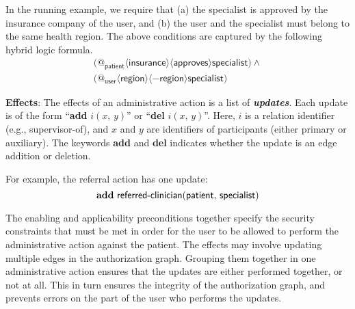 \documentclass{acm_proc_article-sp}
\newcommand{\Dfn}[1]{\textbf{\emph{#1}}}
\begin{document}
\begin{compactitem}
  In the running example, we require that (a) the \textsf{specialist}
  is approved by the insurance company of the \textsf{user}, and (b)
  the \textsf{user} and the \textsf{specialist} must belong to the
  same health region.  The above conditions are captured by the
  following hybrid logic formula.
  \begin{multline*}
    \big(
    @_{\mathsf{patient}} \langle
    \mathsf{insurance} \rangle
    \langle \mathsf{approves}\rangle
    \mathsf{specialist} 
    \big) \land \mbox{}\\
    \big(
    @_{\mathsf{user}} \langle
    \mathsf{region} \rangle
   \langle -
    \mathsf{region} \rangle
    \mathsf{specialist}
    \big)
  \end{multline*}
\item \textbf{Effects}: The effects of an administrative action is a
  list of \Dfn{updates}.  Each update is of the form
  ``\textbf{add} $i(x,\,y)$'' or ``\textbf{del} $i(x,\,y)$''.
  Here, $i$ is a relation identifier (e.g., \textsf{supervisor-of}),
  and $x$ and $y$ are identifiers of participants (either primary or
  auxiliary).  The keywords \textbf{add} and \textbf{del} indicates
  whether the update is an edge addition or deletion.

  For example, the referral action has one update:
  \[
     \text{\textbf{add} $\mathsf{referred}\text{-}\mathsf{clinician}(\mathsf{patient},\,
     \mathsf{specialist})$}
  \]
\end{compactitem}
The enabling and applicability preconditions together specify the
security constraints that must be met in order for the \textsf{user}
to be allowed to perform the administrative action against the
\textsf{patient}.  The effects may involve updating multiple edges in
the authorization graph.  Grouping them together in one administrative
action ensures that the updates are either performed together, or not
at all.  This in turn ensures the integrity of the authorization
graph, and prevents errors on the part of the \textsf{user} who
performs the updates.
\end{document}

